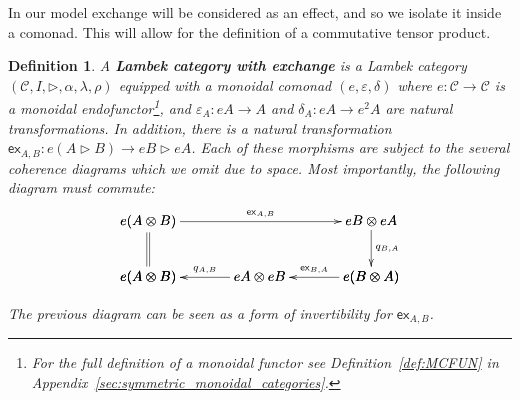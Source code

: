 \documentclass{sigplanconf}
\let\mto\to
\let\to\relax
\newcommand{\to}{\rightarrow}
\newcommand{\cat}[1]{\mathcal{#1}}
\newtheorem{definition}[theorem]{Definition}
\begin{document}
In our model exchange will be considered as an effect, and so we
isolate it inside a comonad.  This will allow for the definition of a
commutative tensor product.
\begin{definition}
  \label{def:exchange-comonad}
  A \textbf{Lambek category with exchange} is a Lambek category
  $(\cat{C}, I, \rhd, \alpha, \lambda, \rho)$ equipped with a monoidal
  comonad $(e, \varepsilon, \delta)$ where $e : \cat{C} \mto \cat{C}$
  is a monoidal endofunctor\footnote{For the full definition of a
    monoidal functor see Definition~\ref{def:MCFUN} in
    Appendix~\ref{sec:symmetric_monoidal_categories}.}, and
  $\varepsilon_A : eA \mto A$ and $\delta_A : eA \mto e^2A$ are
  natural transformations.  In addition, there is a natural
  transformation $\mathsf{ex}_{A,B} : e(A \rhd B) \mto eB \rhd
  eA$. Each of these morphisms are subject to the several coherence
  diagrams which we omit due to space.  Most importantly, the
  following diagram must commute:
  \[
  \bfig
    \square/->`=`->`/<1600,400>[
      e(A\otimes B)`
      eB\otimes eA`
      e(A\otimes B)`
      e(B\otimes A);
      \mathsf{ex}_{A,B}``
      q_{B,A}`]
    \morphism(800,0)<-800,0>[
      eA\otimes eB`
      e(A\otimes B);
      q_{A,B}]
    \morphism(1600,0)<-800,0>[
      e(B\otimes A)`
      eA\otimes eB;
      \mathsf{ex}_{B,A}]
    \efig
    \]
  
  
    \noindent
  The previous diagram can be seen as a form of invertibility for
  $\mathsf{ex}_{A,B}$.
\end{definition}
\end{document}
